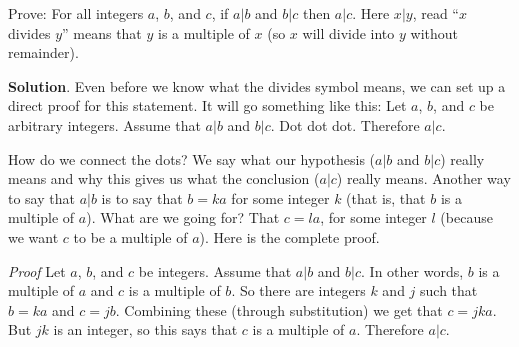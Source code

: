 \documentclass[11pt,]{book}
\makeatletter
\theoremstyle{ptxplainnotitle}
\theoremstyle{ptxplaintitle}
\renewcommand*{\proofname}{Proof}
\renewenvironment{proof}[1][\proofname]{\par
  \pushQED{\qed}%
  \normalfont \topsep6\p@\@plus6\p@\relax
  \trivlist
  \item\relax
    {\itshape
    #1\@addpunct{.}}\hspace\labelsep\ignorespaces
}{%
  \popQED\endtrivlist\@endpefalse
}
\theoremstyle{ptxdefinitionnotitle}
\theoremstyle{ptxdefinitiontitle}
\theoremstyle{ptxdefinitionnotitle}
\theoremstyle{ptxdefinitiontitle}
\theoremstyle{ptxdefinitionnotitle}
\theoremstyle{ptxdefinitiontitle}
\theoremstyle{ptxdefinitiontitlenonumber}
\theoremstyle{ptxdefinitiontitlenonumber}
\numberwithin{equation}{chapter}
\makeatother
\begin{document}
\begin{example}\label{example-64}
\hypertarget{p-2543}{}%
Prove: For all integers \(a\), \(b\), and \(c\), if \(a|b\) and \(b|c\) then \(a|c\). Here \(x|y\), read ``\(x\) divides \(y\)'' means that \(y\) is a multiple of \(x\) (so \(x\) will divide into \(y\) without remainder).%
\par\smallskip%
\noindent\textbf{Solution}.\hypertarget{solution-288}{}\quad%
\hypertarget{p-2544}{}%
Even before we know what the divides symbol means, we can set up a direct proof for this statement. It will go something like this: Let \(a\), \(b\), and \(c\) be arbitrary integers. Assume that \(a|b\) and \(b|c\). Dot dot dot. Therefore \(a|c\).%
\par
\hypertarget{p-2545}{}%
How do we connect the dots? We say what our hypothesis (\(a|b\) and \(b|c\)) really means and why this gives us what the conclusion (\(a|c\)) really means. Another way to say that \(a|b\) is to say that \(b = ka\) for some integer \(k\) (that is, that \(b\) is a multiple of \(a\)). What are we going for? That \(c = la\), for some integer \(l\) (because we want \(c\) to be a multiple of \(a\)). Here is the complete proof.%
\begin{proof}\hypertarget{proof-26}{}
\hypertarget{p-2546}{}%
Let \(a\), \(b\), and \(c\) be integers. Assume that \(a|b\) and \(b|c\). In other words, \(b\) is a multiple of \(a\) and \(c\) is a multiple of \(b\). So there are integers \(k\) and \(j\) such that \(b = ka\) and \(c = jb\). Combining these (through substitution) we get that \(c = jka\). But \(jk\) is an integer, so this says that \(c\) is a multiple of \(a\). Therefore \(a|c\).%
\end{proof}
\end{example}
\typeout{************************************************}
\typeout{************************************************}
\end{document}

